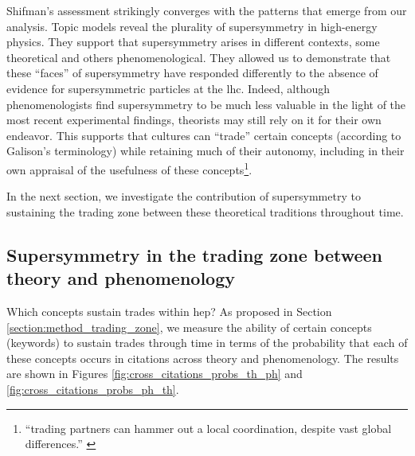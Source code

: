 \documentclass[smallextended]{svjour3}
\begin{document}


Shifman's assessment strikingly converges with the patterns that emerge from our analysis. Topic models reveal the plurality of supersymmetry in high-energy physics. They support that supersymmetry arises in different contexts, some theoretical and others phenomenological. They allowed us to demonstrate that these ``faces'' of supersymmetry have responded differently to the absence of evidence for supersymmetric particles at the \gls{lhc}. Indeed, although phenomenologists find supersymmetry to be much less valuable in the light of the most recent experimental findings, theorists may still rely on it for their own endeavor. This supports that cultures can ``trade'' certain concepts (according to Galison's terminology) while retaining much of their autonomy, including in their own appraisal of the usefulness of these concepts\footnote{``trading partners can hammer out a local coordination, despite vast global differences.'' \citep[p.~783]{galison1997image}}. 

In the next section, we investigate the contribution of supersymmetry to sustaining the trading zone between these theoretical traditions throughout time.

\subsection{Supersymmetry in the trading zone between theory and phenomenology}

Which concepts sustain trades within \gls{hep}? As proposed in Section \ref{section:method_trading_zone}, we measure the ability of certain concepts (keywords) to sustain trades through time in terms of the probability that each of these concepts occurs in citations across theory and phenomenology. The results are shown in Figures \ref{fig:cross_citations_probs_th_ph} and \ref{fig:cross_citations_probs_ph_th}.
\end{document}
